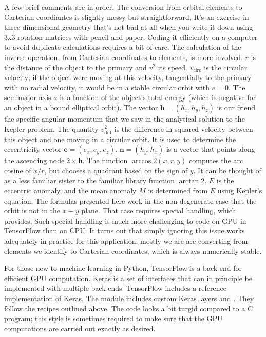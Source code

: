 A few brief comments are in order.
The conversion from orbital elements to Cartesian coordiantes is slightly messy but straightforward.
It's an exercise in three dimensional geometry that's not bad at all when you write it down using 3x3 rotation matrices with pencil and paper.
Coding it efficiently on a computer to avoid duplicate calculations requires a bit of care.
The calculation of the inverse operation, from Cartesian coordinates to elements, is more involved.
$r$ is the distance of the object to the primary and $v^2$ its speed.
$v_{\mathrm{circ}}$ is the circular velocity; if the object were moving at this velocity, 
tangentially to the primary with no radial velocity, it would be in a stable circular orbit with $e=0$.
The semimajor axis $a$ is a function of the object's total energy (which is negative for an object in a bound elliptical orbit).
The vector $\mathbf{h} = (h_x, h_y, h_z)$ is our friend the specific angular momentum that we saw in the analytical solution to the Kepler problem.
The quantity $v^2_{\mathrm{diff}}$ is the difference in squared velocity between this object and one moving in a circular orbit.
It is used to determine the eccentricity vector $\mathbf{e} = (e_x, e_y, e_z)$.
$\mathbf{n} = (h_y, h_x)$ is a vector that points along the ascending node $\hat{z} \times \mathbf{h}$.
The function $\arccos2(x, r, y)$ computes the arc cosine of $x / r$, but chooses a quadrant based on the sign of $y$.
It can be thought of as a less familiar sister to the familiar library function $\arctan2$.
$E$ is the eccentric anomaly, and the mean anomaly $M$ is determined from $E$ using Kepler's equation.
The formulas presented here work in the non-degenerate case that the orbit is not in the $x-y$ plane.
That case requires special handling, which  provides.
Such special handling is much more challenging to code on GPU in TensorFlow than on CPU.
It turns out that simply ignoring this issue works adequately in practice for this application;
mostly we are are converting from elements we identify to Cartesian coordinates, which is always numerically stable.

For those new to machine learning in Python, TensorFlow is a back end for efficient GPU computation.
Keras is a set of interfaces that can in principle be implemented with multiple back ends.
TensorFlow includes a reference implementation of Keras.
The module  includes custom Keras layers  and .
They follow the recipes outlined above.  
The code looks a bit turgid compared to a C program; 
this style is sometimes required to make sure that the GPU computations are carried out exactly as desired.

